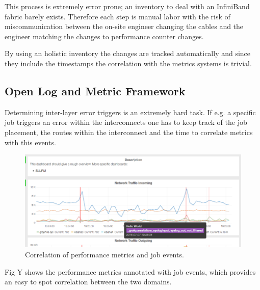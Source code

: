 This process is extremely error prone; an inventory to deal with an InfiniBand fabric barely exists. Therefore each step is manual labor with the risk of miscommunication between the on-site engineer changing the
cables and the engineer matching the changes to performance counter changes.

By using an holistic inventory the changes are tracked automatically and since they include the timestamps the correlation with the metrics systems is trivial.

\subsection{Open Log and Metric Framework}
Determining inter-layer error triggers is an extremely hard task. If e.g. a specific job triggers an error within the interconnects one has to keep track of the job placement, the routes within the interconnect and
the time to correlate metrics with this events.

\begin{figure}[!ht]
    \includegraphics[width=.4\textwidth]{images/png/mon_cor.png}
    \caption{\label{fig:job_correlation}Correlation of performance metrics and job events.}
\end{figure}
Fig Y shows the performance metrics annotated with job events, which provides an easy to spot correlation between the two domains.